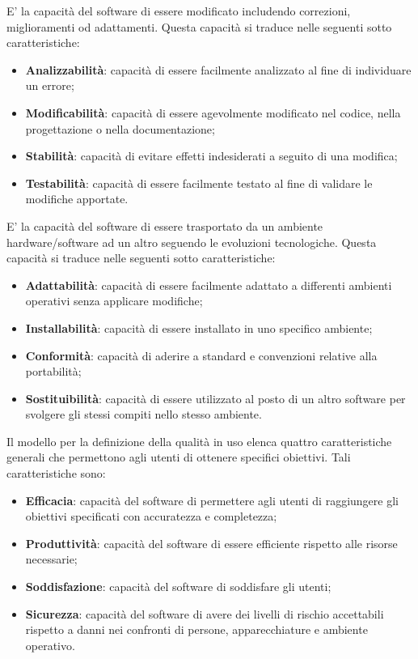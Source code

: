 	E' la capacità del software di essere modificato includendo correzioni, miglioramenti od adattamenti. Questa capacità si traduce nelle seguenti sotto caratteristiche:
	\begin{itemize}
		\item{\textbf{Analizzabilità}: capacità di essere facilmente analizzato al fine di individuare un errore;}
		\item{\textbf{Modificabilità}: capacità di essere agevolmente modificato nel codice, nella progettazione o nella documentazione;}
		\item{\textbf{Stabilità}: capacità di evitare effetti indesiderati a seguito di una modifica;}
		\item{\textbf{Testabilità}: capacità di essere facilmente testato al fine di validare le modifiche apportate.}
	\end{itemize}

	E' la capacità del software di essere trasportato da un ambiente hardware/software ad un altro seguendo le evoluzioni tecnologiche. Questa capacità si traduce nelle seguenti sotto caratteristiche:
	\begin{itemize}
		\item{\textbf{Adattabilità}: capacità di essere facilmente adattato a differenti ambienti operativi senza applicare modifiche;}
		\item{\textbf{Installabilità}: capacità di essere installato in uno specifico ambiente;}
		\item{\textbf{Conformità}: capacità di aderire a standard e convenzioni relative alla portabilità;}
		\item{\textbf{Sostituibilità}: capacità di essere utilizzato al posto di un altro software per svolgere gli stessi compiti nello stesso ambiente.}
	\end{itemize}
	
	Il modello per la definizione della qualità in uso elenca quattro caratteristiche generali che permettono agli utenti di ottenere specifici obiettivi. Tali caratteristiche sono:
	\begin{itemize}
		\item{\textbf{Efficacia}: capacità del software di permettere agli utenti di raggiungere gli obiettivi specificati con accuratezza e completezza;}
		\item{\textbf{Produttività}: capacità del software di essere efficiente rispetto alle risorse necessarie;}
		\item{\textbf{Soddisfazione}: capacità del software di soddisfare gli utenti;}
		\item{\textbf{Sicurezza}: capacità del software di avere dei livelli di rischio accettabili rispetto a danni nei confronti di persone, apparecchiature e ambiente operativo.}
	\end{itemize}
	
